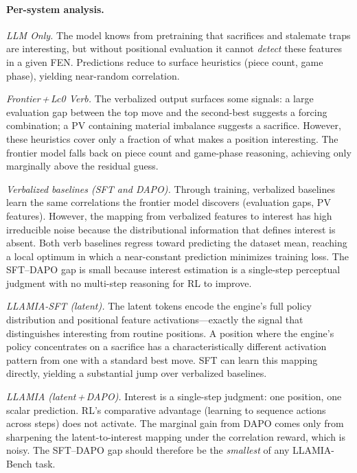 \paragraph{Per-system analysis.}

\emph{LLM Only.}
The model knows from pretraining that sacrifices and stalemate traps are
interesting, but without positional evaluation it cannot \emph{detect} these
features in a given FEN\@.
Predictions reduce to surface heuristics (piece count, game phase), yielding
near-random correlation.

\emph{Frontier\,+\,Lc0 Verb.}
The verbalized output surfaces some signals: a large evaluation gap between
the top move and the second-best suggests a forcing combination; a PV
containing material imbalance suggests a sacrifice.
However, these heuristics cover only a fraction of what makes a position
interesting.
The frontier model falls back on piece count and game-phase reasoning,
achieving only marginally above the residual guess.

\emph{Verbalized baselines (SFT and DAPO).}
Through training, verbalized baselines learn the same correlations the
frontier model discovers (evaluation gaps, PV features).
However, the mapping from verbalized features to interest has high
irreducible noise because the distributional information that defines
interest is absent.
Both verb baselines regress toward predicting the dataset mean, reaching
a local optimum in which a near-constant prediction minimizes training loss.
The SFT--DAPO gap is small because interest estimation is a single-step
perceptual judgment with no multi-step reasoning for RL to improve.

\emph{LLAMIA-SFT (latent).}
The latent tokens encode the engine's full policy distribution and
positional feature activations---exactly the signal that distinguishes
interesting from routine positions.
A position where the engine's policy concentrates on a sacrifice has a
characteristically different activation pattern from one with a standard
best move.
SFT can learn this mapping directly, yielding a substantial jump over
verbalized baselines.

\emph{LLAMIA (latent\,+\,DAPO).}
Interest is a single-step judgment: one position, one scalar prediction.
RL's comparative advantage (learning to sequence actions across steps) does
not activate.
The marginal gain from DAPO comes only from sharpening the latent-to-interest
mapping under the correlation reward, which is noisy.
The SFT--DAPO gap should therefore be the \emph{smallest} of any LLAMIA-Bench
task.


